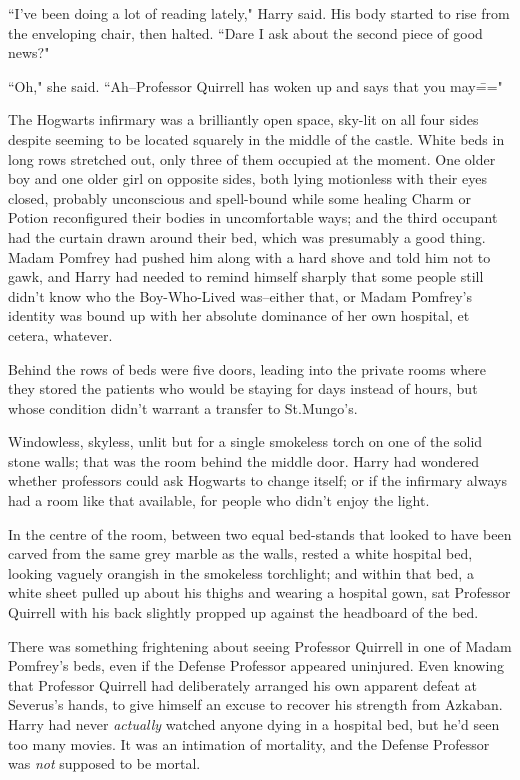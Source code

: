 ``I've been doing a lot of reading lately," Harry said. His body started to rise from the enveloping chair, then halted. ``Dare I ask about the second piece of good news?"

``Oh," she said. ``Ah\---Professor Quirrell has woken up and says that you may\==="

\later

The Hogwarts infirmary was a brilliantly open space, sky-lit on all four sides despite seeming to be located squarely in the middle of the castle. White beds in long rows stretched out, only three of them occupied at the moment. One older boy and one older girl on opposite sides, both lying motionless with their eyes closed, probably unconscious and spell-bound while some healing Charm or Potion reconfigured their bodies in uncomfortable ways; and the third occupant had the curtain drawn around their bed, which was presumably a good thing. Madam Pomfrey had pushed him along with a hard shove and told him not to gawk, and Harry had needed to remind himself sharply that some people still didn't know who the Boy-Who-Lived was\---either that, or Madam Pomfrey's identity was bound up with her absolute dominance of her own hospital, et cetera, whatever.

Behind the rows of beds were five doors, leading into the private rooms where they stored the patients who would be staying for days instead of hours, but whose condition didn't warrant a transfer to St.\?Mungo's.

Windowless, skyless, unlit but for a single smokeless torch on one of the solid stone walls; that was the room behind the middle door. Harry had wondered whether professors could ask Hogwarts to change itself; or if the infirmary always had a room like that available, for people who didn't enjoy the light.

In the centre of the room, between two equal bed-stands that looked to have been carved from the same grey marble as the walls, rested a white hospital bed, looking vaguely orangish in the smokeless torchlight; and within that bed, a white sheet pulled up about his thighs and wearing a hospital gown, sat Professor Quirrell with his back slightly propped up against the headboard of the bed.

There was something frightening about seeing Professor Quirrell in one of Madam Pomfrey's beds, even if the Defense Professor appeared uninjured. Even knowing that Professor Quirrell had deliberately arranged his own apparent defeat at Severus's hands, to give himself an excuse to recover his strength from Azkaban. Harry had never \emph{actually} watched anyone dying in a hospital bed, but he'd seen too many movies. It was an intimation of mortality, and the Defense Professor was \emph{not} supposed to be mortal.

